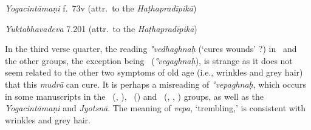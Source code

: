 \begin{ekdosis}
\begin{testimonia}[hp03_029]
\emph{Yogacintāmaṇi} f.~73v (attr.~to the \emph{Haṭhapradīpikā})
\begin{versinnote}
\end{versinnote}

\emph{Yuktabhavadeva} 7.201 (attr.~to the \emph{Haṭhapradīpikā})
\begin{versinnote}
\end{versinnote}

\end{testimonia}

\begin{philcomm}[hp03_029]
In the third verse quarter, the reading \emph{°vedhaghnaḥ} (`cures wounds' ?) in \textalpha\ and the other groups, the exception being \textgamma\ (\emph{°vegaghnaḥ}), is strange as it does not seem related to the other two symptoms of old age (i.e., wrinkles and grey hair) that this \emph{mudrā} can cure. It is perhaps a misreading of \emph{°vepaghnaḥ}, which occurs in some manuscripts in the \textbeta\ (, ), \textepsilon\ () and \textdelta\ (, , ) groups, as well as the \emph{Yogacintāmaṇi} and \emph{Jyotsnā}. The meaning of \emph{vepa}, `trembling,' is consistent with wrinkles and grey hair.

\end{philcomm}


\end{ekdosis}
